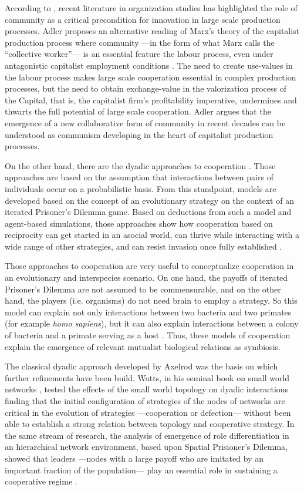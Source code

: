 According to \citet{adler:2015}, recent literature in organization studies \citep{omahony:2011} has highlighted the role of community \citep{tonnies:1974} as a critical precondition for innovation in large scale production processes. Adler proposes an alternative reading of Marx's theory of the capitalist production process where community ---in the form of what Marx calls the ``collective worker''--- is an essential feature the labour process, even under antagonistic capitalist employment conditions \citep[446]{adler:2015}. The need to create use-values in the labour process makes large scale cooperation essential in complex production processes, but the need to obtain exchange-value in the valorization process of the Capital, that is, the capitalist firm's profitability imperative, undermines and thwarts the full potential of large scale cooperation. Adler argues that the emergence of a new collaborative form of community in recent decades can be understood as communism developing in the heart of capitalist production processes.

On the other hand, there are the dyadic approaches to cooperation \citep{axelrod1981,axelrod:1997}. Those approaches are based on the assumption that interactions between pairs of individuals occur on a probabilistic basis. From this standpoint, models are developed based on the concept of an evolutionary strategy on the context of an iterated Prisoner's Dilemma game. Based on deductions from such a model and agent-based simulations, those approaches show how cooperation based on reciprocity can get started in an asocial world, can thrive while interacting with a wide range of other strategies, and can resist invasion once fully established \citep{axelrod1981}.

Those approaches to cooperation are very useful to conceptualize cooperation in an evolutionary and interspecies scenario. On one hand, the payoffs of iterated Prisoner's Dilemma are not assumed to be commensurable, and on the other hand, the players (i.e. organisms) do not need brain to employ a strategy. So this model can explain not only interactions between two bacteria and two primates (for example \emph{homo sapiens}), but it can also explain interactions between a colony of bacteria and a primate serving as a host \citep[211]{axelrod1981}. Thus, these models of cooperation explain the emergence of relevant mutualist biological relations as symbiosis.

The classical dyadic approach developed by Axelrod was the basis on which further refinements have been build. Watts, in his seminal book on small world networks \citep{watts:1999}, tested the effects of the small world topology on dyadic interactions finding that the initial configuration of strategies of the nodes of networks are critical in the evolution of strategies ---cooperation or defection--- without been able to establish a strong relation between topology and cooperative strategy. In the same stream of research, the analysis of emergence of role differentiation in an hierarchical network environment, based upon Spatial Prisioner's Dilemma, showed that leaders ---nodes with a large payoff who are imitated by an important fraction of the population--- play an essential role in sustaining a cooperative regime \citep*{eguiluz:2005}.

